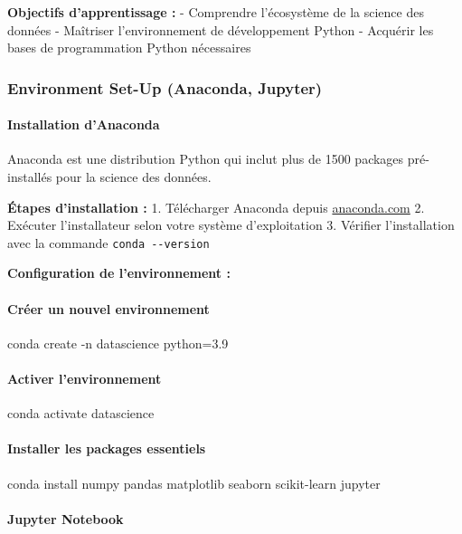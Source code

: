 \documentclass[11pt]{article}
\begin{document}
\textbf{Objectifs d'apprentissage :} - Comprendre l'écosystème de la
science des données - Maîtriser l'environnement de développement Python
- Acquérir les bases de programmation Python nécessaires

\subsubsection{Environment Set-Up (Anaconda, Jupyter)}\label{environment-set-up-anaconda-jupyter}

\paragraph{Installation d'Anaconda}\label{installation-danaconda}

Anaconda est une distribution Python qui inclut plus de 1500 packages
pré-installés pour la science des données.

\textbf{Étapes d'installation :} 1. Télécharger Anaconda depuis
\href{https://www.anaconda.com/products/distribution}{anaconda.com} 2.
Exécuter l'installateur selon votre système d'exploitation 3. Vérifier
l'installation avec la commande \texttt{conda\ -\/-version}

\textbf{Configuration de l'environnement :}

    \paragraph{Créer un nouvel
environnement}\label{cruxe9er-un-nouvel-environnement}

conda create -n datascience python=3.9

\paragraph{Activer l'environnement}\label{activer-lenvironnement}

conda activate datascience

\paragraph{Installer les packages
essentiels}\label{installer-les-packages-essentiels}

conda install numpy pandas matplotlib seaborn scikit-learn jupyter

    \paragraph{Jupyter Notebook}\label{jupyter-notebook}
\end{document}
